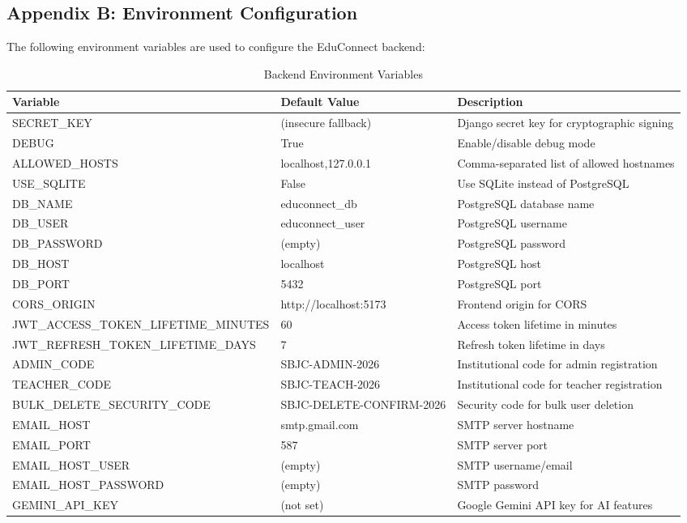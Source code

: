 \newpage
\subsection*{Appendix B: Environment Configuration}

The following environment variables are used to configure the EduConnect backend:

\begin{table}[H]
\centering
\caption{Backend Environment Variables}
\label{tab:env_vars}
\footnotesize
\begin{tabular}{|p{4.5cm}|p{3.5cm}|p{5.5cm}|}
\hline
\textbf{Variable} & \textbf{Default Value} & \textbf{Description} \\
\hline
SECRET\_KEY & (insecure fallback) & Django secret key for cryptographic signing \\
\hline
DEBUG & True & Enable/disable debug mode \\
\hline
ALLOWED\_HOSTS & localhost,127.0.0.1 & Comma-separated list of allowed hostnames \\
\hline
USE\_SQLITE & False & Use SQLite instead of PostgreSQL \\
\hline
DB\_NAME & educonnect\_db & PostgreSQL database name \\
\hline
DB\_USER & educonnect\_user & PostgreSQL username \\
\hline
DB\_PASSWORD & (empty) & PostgreSQL password \\
\hline
DB\_HOST & localhost & PostgreSQL host \\
\hline
DB\_PORT & 5432 & PostgreSQL port \\
\hline
CORS\_ORIGIN & http://localhost:5173 & Frontend origin for CORS \\
\hline
JWT\_ACCESS\_TOKEN\_LIFETIME\_MINUTES & 60 & Access token lifetime in minutes \\
\hline
JWT\_REFRESH\_TOKEN\_LIFETIME\_DAYS & 7 & Refresh token lifetime in days \\
\hline
ADMIN\_CODE & SBJC-ADMIN-2026 & Institutional code for admin registration \\
\hline
TEACHER\_CODE & SBJC-TEACH-2026 & Institutional code for teacher registration \\
\hline
BULK\_DELETE\_SECURITY\_CODE & SBJC-DELETE-CONFIRM-2026 & Security code for bulk user deletion \\
\hline
EMAIL\_HOST & smtp.gmail.com & SMTP server hostname \\
\hline
EMAIL\_PORT & 587 & SMTP server port \\
\hline
EMAIL\_HOST\_USER & (empty) & SMTP username/email \\
\hline
EMAIL\_HOST\_PASSWORD & (empty) & SMTP password \\
\hline
GEMINI\_API\_KEY & (not set) & Google Gemini API key for AI features \\
\hline
\end{tabular}
\end{table}

